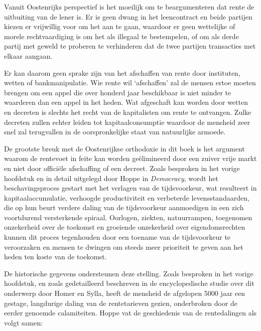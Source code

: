 Vanuit Oostenrijks perspectief is het moeilijk om te beargumenteren dat rente de uitbuiting van de lener is. Er is geen dwang in het leencontract en beide partijen kiezen er vrijwillig voor om het aan te gaan, waardoor er geen wettelijke of morele rechtvaardiging is om het als illegaal te bestempelen, of om als derde partij met geweld te proberen te verhinderen dat de twee partijen transacties met elkaar aangaan.

\begin{blockquotebox}
Er kan daarom geen sprake zijn van het afschaffen van rente door instituten, wetten of bankmanipulatie. Wie rente wil `afschaffen' zal de mensen ertoe moeten brengen om een appel die over honderd jaar beschikbaar is niet minder te waarderen dan een appel in het heden. Wat afgeschaft kan worden door wetten en decreten is slechts het recht van de kapitalisten om rente te ontvangen. Zulke decreten zullen echter leiden tot kapitaalconsumptie waardoor de mensheid zeer snel zal terugvallen in de oorspronkelijke staat van natuurlijke armoede.\footnotemark
\end{blockquotebox}

De grootste breuk met de Oostenrijkse orthodoxie in dit boek is het argument waarom de rentevoet in feite kan worden geëlimineerd door een zuiver vrije markt en niet door officiële afschaffing of een decreet. Zoals besproken in het vorige hoofdstuk en in detail uitgelegd door Hoppe in \emph{Democracy}, wordt het beschavingsproces gestart met het verlagen van de tijdsvoorkeur, wat resulteert in kapitaalaccumulatie, verhoogde productiviteit en verbeterde levensstandaarden, die op hun beurt verdere daling van de tijdsvoorkeur aanmoedigen in een zich voortdurend versterkende spiraal. Oorlogen, ziekten, natuurrampen, toegenomen onzekerheid over de toekomst en groeiende onzekerheid over eigendomsrechten kunnen dit proces tegenhouden door een toename van de tijdsvoorkeur te veroorzaken en mensen te dwingen om steeds meer prioriteit te geven aan het heden ten koste van de toekomst.

De historische gegevens ondersteunen deze stelling. Zoals besproken in het vorige hoofdstuk, en zoals gedetailleerd beschreven in de encyclopedische studie over dit onderwerp door Homer en Sylla, heeft de mensheid de afgelopen 5000 jaar een gestage, langdurige daling van de rentetarieven gezien, onderbroken door de eerder genoemde calamiteiten.\autocite{163} Hoppe vat de geschiedenis van de rentedalingen als volgt samen:

